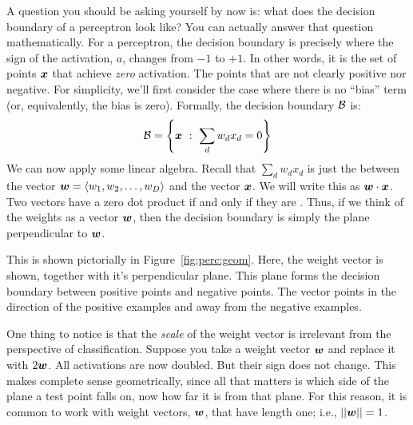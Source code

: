 A question you should be asking yourself by now is: what does the
decision boundary of a perceptron look like?  You can actually answer
that question mathematically.  For a perceptron, the decision boundary
is precisely where the sign of the activation, $a$, changes from $-1$
to $+1$.  In other words, it is the set of points ${\boldsymbol{x}}$ that achieve
\emph{zero} activation.  The points that are not clearly positive nor
negative.  For simplicity, we'll first consider the case where there
is no ``bias'' term (or, equivalently, the bias is zero).  Formally,
the decision boundary $\mathcal{B}$ is:
\begin{equation}
\mathcal{B} = \left\{ {\boldsymbol{x}} ~:~ \sum_d w_d x_d = 0 \right\}
\end{equation}
We can now apply some linear algebra.  Recall that $\sum_d w_d x_d$ is
just the  between the vector ${\boldsymbol{w}} = \langle w_1,
w_2, \dots, w_D \rangle$ and the vector ${\boldsymbol{x}}$.  We will write this as
${\boldsymbol{w}} \cdot {\boldsymbol{x}}$.  Two vectors have a zero dot product if and only if
they are .  Thus, if we think of the weights as
a vector ${\boldsymbol{w}}$, then the decision boundary is simply the plane
perpendicular to ${\boldsymbol{w}}$.


This is shown pictorially in Figure~\ref{fig:perc:geom}.  Here, the
weight vector is shown, together with it's perpendicular plane.  This
plane forms the decision boundary between positive points and negative
points.  The vector points in the direction of the positive examples
and away from the negative examples.

One thing to notice is that the \emph{scale} of the weight vector is
irrelevant from the perspective of classification.  Suppose you take a
weight vector ${\boldsymbol{w}}$ and replace it with $2 {\boldsymbol{w}}$.  All activations are
now doubled.  But their sign does not change.  This makes complete
sense geometrically, since all that matters is which side of the plane
a test point falls on, now how far it is from that plane.  For this
reason, it is common to work with 
weight vectors, ${\boldsymbol{w}}$, that have length one; i.e., $\left\vert\left\vert {\boldsymbol{w}} \right\vert\right\vert = 1$.



